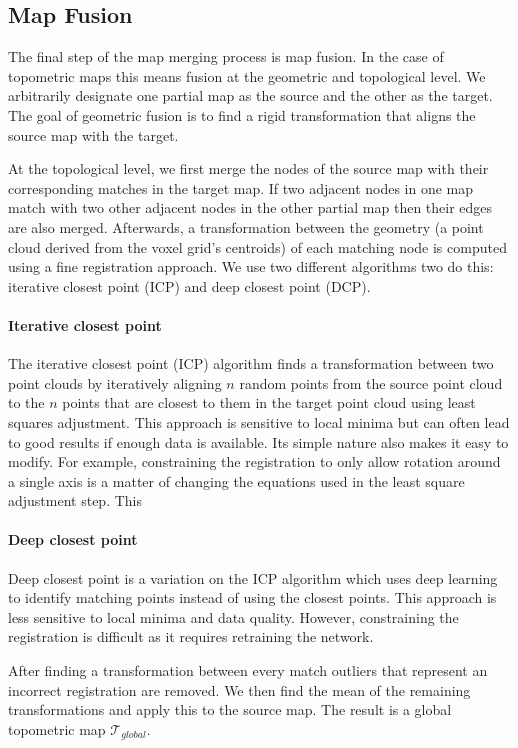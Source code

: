 \subsection{Map Fusion}
The final step of the map merging process is map fusion. In the case of topometric maps this means fusion at the geometric and topological level. We arbitrarily designate one partial map as the source and the other as the target. The goal of geometric fusion is to find a rigid transformation that aligns the source map with the target. 

At the topological level, we first merge the nodes of the source map with their corresponding matches in the target map. If two adjacent nodes in one map match with two other adjacent nodes in the other partial map then their edges are also merged. Afterwards, a transformation between the geometry (a point cloud derived from the voxel grid's centroids) of each matching node is computed using a fine registration approach. We use two different algorithms two do this: iterative closest point (ICP) and deep closest point (DCP).

\paragraph{Iterative closest point}
The iterative closest point (ICP) algorithm finds a transformation between two point clouds by iteratively aligning \(n\) random points from the source point cloud to the \(n\) points that are closest to them in the target point cloud using least squares adjustment. This approach is sensitive to local minima but can often lead to good results if enough data is available. Its simple nature also makes it easy to modify. For example, constraining the registration to only allow rotation around a single axis is a matter of changing the equations used in the least square adjustment step. This

\paragraph{Deep closest point}
Deep closest point is a variation on the ICP algorithm which uses deep learning to identify matching points instead of using the closest points. This approach is less sensitive to local minima and data quality. However, constraining the registration is difficult as it requires retraining the network.

After finding a transformation between every match outliers that represent an incorrect registration are removed. We then find the mean of the remaining transformations and apply this to the source map. The result is a global topometric map \(\mathcal{T}_{global}\).
